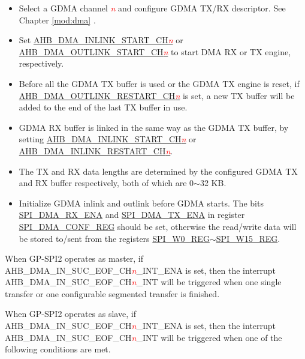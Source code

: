 \documentclass[main\_\_EN.tex]{subfiles}
\begin{document}
\begin{itemize}
    \item Select a GDMA channel \textcolor{red}{\it{n}} and configure GDMA TX/RX descriptor. See Chapter \ref{mod:dma} \textit{}.
    \item Set \hyperref[fielddesc:AHBDMAINLINKSTARTCHN]{AHB\_DMA\_INLINK\_START\_CH\textcolor{red}{\it{n}}} or \hyperref[fielddesc:AHBDMAOUTLINKSTARTCHN]{AHB\_DMA\_OUTLINK\_START\_CH\textcolor{red}{\it{n}}} to start DMA RX or TX engine, respectively. 
    \item Before all the GDMA TX buffer is used or the GDMA TX engine is reset, if \hyperref[fielddesc:AHBDMAOUTLINKRESTARTCHN]{AHB\_DMA\_OUTLINK\_RESTART\_CH\textcolor{red}{\it{n}}} is set, a new TX buffer will be added to the end of the last TX buffer in use.
    \item GDMA RX buffer is linked in the same way as the GDMA TX buffer, by setting \hyperref[fielddesc:AHBDMAINLINKSTARTCHN]{AHB\_DMA\_INLINK\_START\_CH\textcolor{red}{\it{n}}} or \hyperref[fielddesc:AHBDMAINLINKRESTARTCHN]{AHB\_DMA\_INLINK\_RESTART\_CH\textcolor{red}{\it{n}}}.
    \item The TX and RX data lengths are determined by the configured GDMA TX and RX buffer respectively, both of which are 0$\sim$32 KB.
    \item Initialize GDMA inlink and outlink before GDMA starts. The bits \hyperref[fielddesc:SPIDMARXENA]{SPI\_DMA\_RX\_ENA} and \hyperref[fielddesc:SPIDMATXENA]{SPI\_DMA\_TX\_ENA} in register \hyperref[regdesc:SPIDMACONFREG]{SPI\_DMA\_CONF\_REG} should be set, otherwise the read/write data will be stored to/sent from the registers \hyperref[regdesc:SPIW0REG]{SPI\_W0\_REG}$\sim$\hyperref[regdesc:SPIW15REG]{SPI\_W15\_REG}. 
\end{itemize}

When GP-SPI2 operates as master, if AHB\_DMA\_IN\_SUC\_EOF\_CH\textcolor{red}{\it{n}}\_INT\_ENA is set, then the interrupt AHB\_DMA\_IN\_SUC\_EOF\_CH\textcolor{red}{\it{n}}\_INT will be triggered when one single transfer or one configurable segmented transfer is finished.

When GP-SPI2 operates as slave, if AHB\_DMA\_IN\_SUC\_EOF\_CH\textcolor{red}{\it{n}}\_INT\_ENA is set, then the interrupt AHB\_DMA\_IN\_SUC\_EOF\_CH\textcolor{red}{\it{n}}\_INT will be triggered when one of the following conditions are met.
\end{document}
